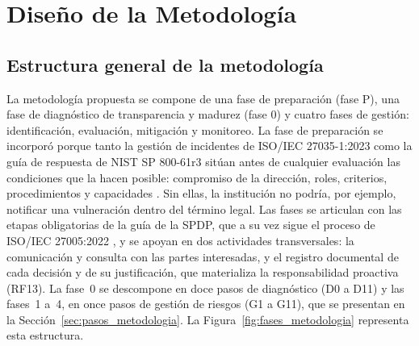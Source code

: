 \section{Diseño de la Metodología}
\label{sec:diseno_solucion}

\subsection{Estructura general de la metodología}

La metodología propuesta se compone de una fase de preparación (fase P), una fase de diagnóstico de transparencia y madurez (fase 0) y cuatro fases de gestión: identificación, evaluación, mitigación y monitoreo. La fase de preparación se incorporó porque tanto la gestión de incidentes de ISO/IEC 27035-1:2023 como la guía de respuesta de NIST SP 800-61r3 sitúan antes de cualquier evaluación las condiciones que la hacen posible: compromiso de la dirección, roles, criterios, procedimientos y capacidades \cite{iso27035_1_2023,iso27035_2_2023,nist2025sp80061r3}. Sin ellas, la institución no podría, por ejemplo, notificar una vulneración dentro del término legal. Las fases se articulan con las etapas obligatorias de la guía de la SPDP, que a su vez sigue el proceso de ISO/IEC 27005:2022 \cite{spdp2026guiav2,iso27005_2022}, y se apoyan en dos actividades transversales: la comunicación y consulta con las partes interesadas, y el registro documental de cada decisión y de su justificación, que materializa la responsabilidad proactiva (RF13). La fase~0 se descompone en doce pasos de diagnóstico (D0 a D11) y las fases~1 a~4, en once pasos de gestión de riesgos (G1 a G11), que se presentan en la Sección~\ref{sec:pasos_metodologia}. La Figura~\ref{fig:fases_metodologia} representa esta estructura.

